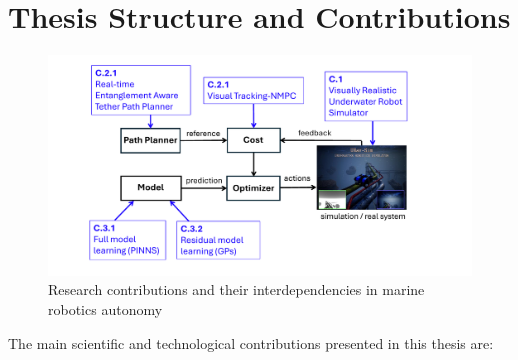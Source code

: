 \section{Thesis Structure and Contributions}

\begin{figure}[h!]
    \centering
    \includegraphics[width=1.0\textwidth]{Phd_thesis/chapters/1.Introduction/figures/contributions_thesis.pdf}
    \caption{Research contributions and their interdependencies in marine robotics autonomy}
    \label{fig:contribution_structure}
\end{figure}

The main scientific and technological contributions presented in this thesis are:

